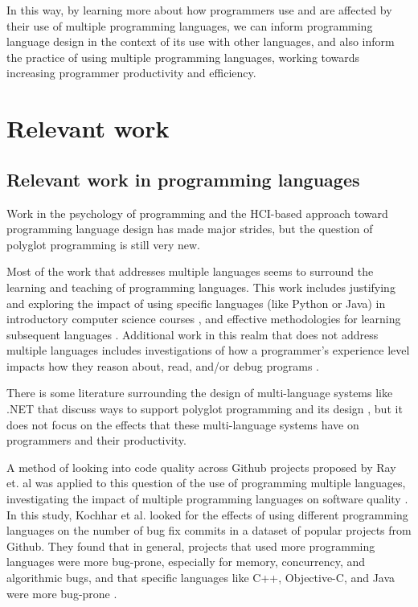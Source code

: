 \documentclass[a4paper,UKenglish,cleveref, autoref]{oasics-v2019}
\begin{document}
In this way, by learning more about how programmers use and are affected by their use of multiple programming languages, we can inform programming language design in the context of its use with other languages, and also inform the practice of using multiple programming languages, working towards increasing programmer productivity and efficiency. 

\section{Relevant work}

\subsection{Relevant work in programming languages}
Work in the psychology of programming and the HCI-based approach toward programming language design has made major strides, but the question of polyglot programming is still very new. 

Most of the work that addresses multiple languages seems to surround the learning and teaching of programming languages. This work includes justifying and exploring the impact of using specific languages (like Python or Java) in introductory computer science courses \cite{pl0024, pl0023}, and effective methodologies for learning subsequent languages \cite{pl0018, pl0022}. Additional work in this realm that does not address multiple languages includes investigations of how a programmer’s experience level impacts how they reason about, read, and/or debug programs \cite{pl0019, pl0021, pl0020}. 

There is some literature surrounding the design of multi-language systems like .NET that discuss ways to support polyglot programming and its design \cite{pl0038}, but it does not focus on the effects that these multi-language systems have on programmers and their productivity. 

A method of looking into code quality across Github projects proposed by Ray et. al \cite{pl0026} was applied to this question of the use of programming multiple languages, investigating the impact of multiple programming languages on software quality \cite{pl0025}. In this study, Kochhar et al. looked for the effects of using different programming languages on the number of bug fix commits in a dataset of popular projects from Github. They found that in general, projects that used more programming languages were more bug-prone, especially for memory, concurrency, and algorithmic bugs, and that specific languages like C++, Objective-C, and Java were more bug-prone \cite{pl0025}.
\end{document}
